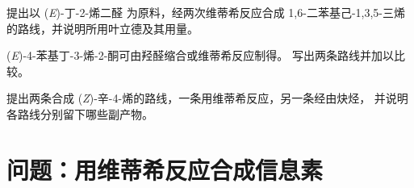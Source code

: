 \begin{exercise}[$\star\star\star$]\label{exo:b2:wittig:10}
提出以 (\textit{E})-丁-2-烯二醛
 为原料，经两次维蒂希反应合成 1,6-二苯基己-1,3,5-三烯的路线，并说明所用叶立德及其用量。
\end{exercise}

\begin{exercise}[$\star\star\star$]\label{exo:b2:wittig:11}
(\textit{E})-4-苯基丁-3-烯-2-酮可由羟醛缩合或维蒂希反应制得。
写出两条路线并加以比较。
\end{exercise}

\begin{exercise}[$\star\star\star$]\label{exo:b2:wittig:12}
提出两条合成 (\textit{Z})-辛-4-烯的路线，一条用维蒂希反应，另一条经由炔烃，
并说明各路线分别留下哪些副产物。
\end{exercise}

\section{问题：用维蒂希反应合成信息素}

